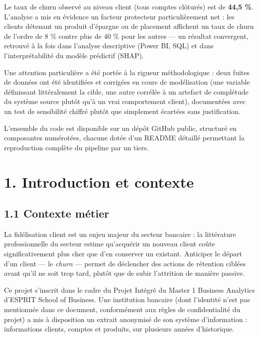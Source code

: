 \documentclass[11pt,a4paper]{article}
\begin{document}
Le taux de churn observé au niveau client (tous comptes clôturés) est de
\textbf{44,5 \%}. L'analyse a mis en évidence un facteur protecteur
particulièrement net : les clients détenant un produit d'épargne ou de
placement affichent un taux de churn de l'ordre de 8 \% contre plus de
40 \% pour les autres --- un résultat convergent, retrouvé à la fois
dans l'analyse descriptive (Power BI, SQL) et dans l'interprétabilité du
modèle prédictif (SHAP).

Une attention particulière a été portée à la rigueur méthodologique :
deux fuites de données ont été identifiées et corrigées en cours de
modélisation (une variable définissant littéralement la cible, une autre
corrélée à un artefact de complétude du système source plutôt qu'à un
vrai comportement client), documentées avec un test de sensibilité
chiffré plutôt que simplement écartées sans justification.

L'ensemble du code est disponible sur un dépôt GitHub public, structuré
en composantes numérotées, chacune dotée d'un README détaillé permettant
la reproduction complète du pipeline par un tiers.

\newpage

\hypertarget{introduction-et-contexte}{%
\section{1. Introduction et contexte}\label{introduction-et-contexte}}

\hypertarget{contexte-muxe9tier}{%
\subsection{1.1 Contexte métier}\label{contexte-muxe9tier}}

La fidélisation client est un enjeu majeur du secteur bancaire : la
littérature professionnelle du secteur estime qu'acquérir un nouveau
client coûte significativement plus cher que d'en conserver un existant.
Anticiper le départ d'un client --- le \emph{churn} --- permet de
déclencher des actions de rétention ciblées avant qu'il ne soit trop
tard, plutôt que de subir l'attrition de manière passive.

Ce projet s'inscrit dans le cadre du Projet Intégré du Master 1 Business
Analytics d'ESPRIT School of Business. Une institution bancaire (dont
l'identité n'est pas mentionnée dans ce document, conformément aux
règles de confidentialité du projet) a mis à disposition un extrait
anonymisé de son système d'information : informations clients, comptes
et produits, sur plusieurs années d'historique.
\end{document}
